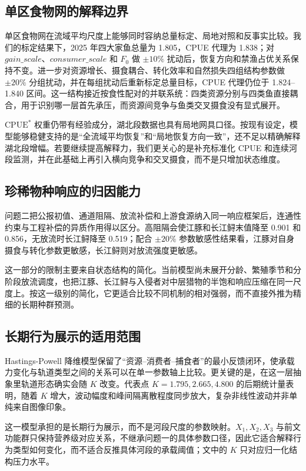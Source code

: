 \documentclass{MMCStyle}
\begin{document}
\subsection{单区食物网的解释边界}
单区食物网在流域平均尺度上能够同时容纳总量标定、局地对照和反事实比较。我们的标定结果下，2025 年四大家鱼总量为 1.805，CPUE 代理为 1.838；对 $gain\_scale$、$consumer\_scale$ 和 $F_0$ 做 $\pm10\%$ 扰动后，恢复方向和禁渔占优关系保持不变。进一步对资源增长、摄食耦合、转化效率和自然损失四组结构参数做 $\pm20\%$ 分组扰动，并在每组扰动后重新标定总量目标，CPUE 代理仍位于 1.824--1.840 区间。这一结构接近按食性配对的并联系统：四类资源分别与四类鱼直接耦合，用于识别哪一层首先承压，而资源间竞争与鱼类交叉摄食没有显式展开。

$\mathrm{CPUE}^*$ 权重仍带有经验成分，湖北段数据也具有局地网具口径。按现有设定，模型能够稳健支持的是“全流域平均恢复”和“局地恢复方向一致”，还不足以精确解释湖北段增幅。若要继续提高解释力，我们更关心的是补充标准化 CPUE 和连续河段监测，并在此基础上再引入横向竞争和交叉摄食，而不是只增加状态维度。

\subsection{珍稀物种响应的归因能力}
问题二把公报初值、通道阻隔、放流补偿和上游食源纳入同一响应框架后，连通性约束与工程补偿的异质作用得以区分。高阻隔会使江豚和长江鲟末值降至 0.901 和 0.856，无放流时长江鲟降至 0.519；配合 $\pm 20\%$ 参数敏感性结果看，江豚对自身摄食与转化参数更敏感，长江鲟则对放流强度更敏感。

这一部分的限制主要来自状态结构的简化。当前模型尚未展开分龄、繁殖季节和分阶段放流调度，也把江豚、长江鲟与入侵者对中层猎物的半饱和响应压缩在同一尺度上。按这一级别的简化，它更适合比较不同机制的相对强弱，而不直接外推为精细的长期种群预测。

\subsection{长期行为展示的适用范围}
Hastings-Powell 降维模型保留了“资源--消费者--捕食者”的最小反馈闭环，使承载力变化与轨道类型之间的关系可以在单一参数轴上比较。更关键的是，在这一层抽象里轨道形态确实会随 $K$ 改变。代表点 $K=1.795,2.665,4.800$ 的后期统计量表明，随着 $K$ 增大，波动幅度和峰间隔离散程度同步放大，复杂非线性波动并非单纯来自图像印象。

这一模型承担的是长期行为展示，而不是河段尺度的参数映射。$X_1,X_2,X_3$ 与前文功能群只保持营养级对应关系，不继承问题一的具体参数口径，因此它适合解释行为类型如何变化，而不适合反推具体河段的承载阈值；文中的 $K$ 只对应归一化结构压力水平。
\end{document}
